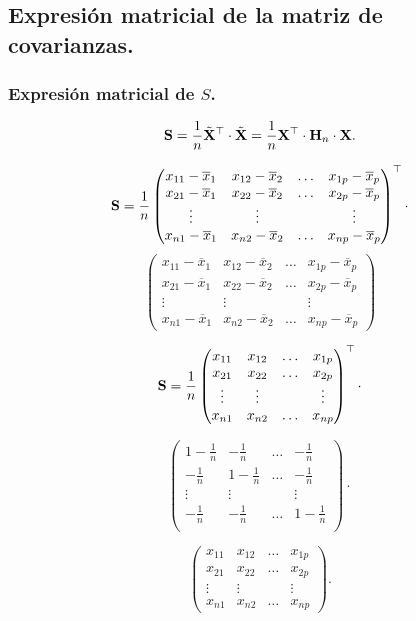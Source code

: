 \subsection{Expresión matricial de la matriz de covarianzas.}
\begin{frame}
\frametitle{Expresión matricial de $S$.}


$$\mathbf{S}=\frac{1}{n} \tilde{\mathbf{X}}^\top\cdot \tilde{\mathbf{X}}= \frac{1}{n} \mathbf{X}^\top\cdot \mathbf{H}_n\cdot \mathbf{X}.$$

$$\mathbf{S}=\frac{1}{n} 
\begin{pmatrix}
x_{1 1}- \overline{x}_1& x_{1 2}- \overline{x}_2 &\ldots & x_{1 p}- \overline{x}_p\\
x_{2 1} - \overline{x}_1& x_{2 2}- \overline{x}_2 &\ldots & x_{2 p}- \overline{x}_p\\
\vdots & \vdots   &       &\vdots\\ 
x_{n 1} - \overline{x}_1& x_{n 2}- \overline{x}_2 &\ldots & x_{n p}- \overline{x}_p
\end{pmatrix}^\top\cdot $$
$$\begin{pmatrix}
x_{1 1}- \overline{x}_1& x_{1 2}- \overline{x}_2 &\ldots & x_{1 p}- \overline{x}_p\\
x_{2 1} - \overline{x}_1& x_{2 2}- \overline{x}_2 &\ldots & x_{2 p}- \overline{x}_p\\
\vdots & \vdots   &       &\vdots\\ 
x_{n 1} - \overline{x}_1& x_{n 2}- \overline{x}_2 &\ldots & x_{n p}- \overline{x}_p
\end{pmatrix}$$

\end{frame}

\begin{frame}



$$\mathbf{S}=\frac{1}{n} 
\begin{pmatrix}
x_{1 1} & x_{1 2} &\ldots & x_{1 p}\\
x_{2 1} & x_{2 2} &\ldots & x_{2 p}\\
\vdots & \vdots   &       &\vdots\\ 
x_{n 1} & x_{n 2} &\ldots & x_{n p}
\end{pmatrix}^\top \cdot 
$$

$$
\begin{pmatrix}
1-\frac{1}{n} & -\frac{1}{n}& \ldots & -\frac{1}{n}\\
-\frac{1}{n} & 1-\frac{1}{n}& \ldots & -\frac{1}{n}\\
\vdots & \vdots &  & \vdots\\
-\frac{1}{n} & -\frac{1}{n} & \ldots & 1-\frac{1}{n}\\
\end{pmatrix}
\cdot
$$

$$\begin{pmatrix}
x_{1 1} & x_{1 2} &\ldots & x_{1 p}\\
x_{2 1} & x_{2 2} &\ldots & x_{2 p}\\
\vdots & \vdots   &       &\vdots\\ 
x_{n 1} & x_{n 2} &\ldots & x_{n p}
\end{pmatrix}.$$

\end{frame}

